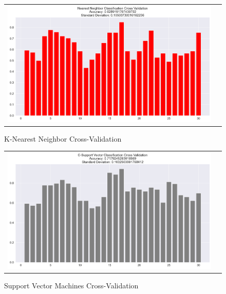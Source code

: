\documentclass[conference]{IEEEtran}
\begin{document}
\begin{figure}[!h]
	\centering
	\begin{center}
		\begin{tabular}{cc}
			\includegraphics[scale=0.2]{pictures/pic_17.png}&
		\end{tabular}
	\end{center}
	\caption{K-Nearest Neighbor Cross-Validation}
	\label{fig:17}
\end{figure}

\begin{figure}[!h]
	\centering
	\begin{center}
		\begin{tabular}{cc}
			\includegraphics[scale=0.2]{pictures/pic_18.png}&
		\end{tabular}
	\end{center}
	\caption{Support Vector Machines Cross-Validation}
	\label{fig:18}
\end{figure}
\end{document}
